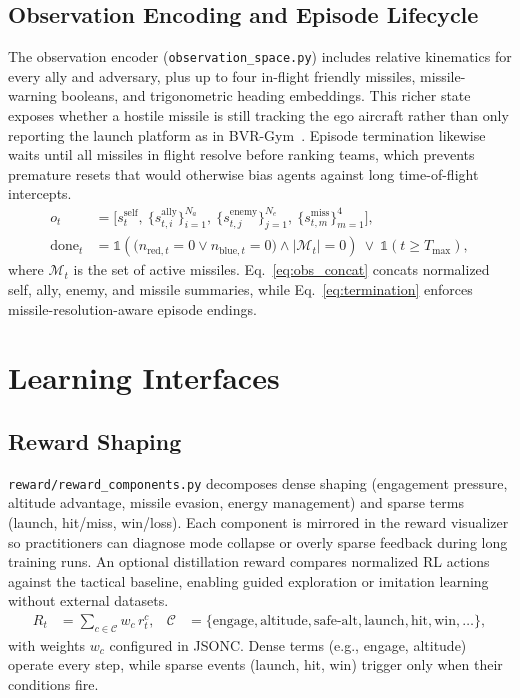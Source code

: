 \documentclass[11pt]{article}
\begin{document}
\subsection{Observation Encoding and Episode Lifecycle}
The observation encoder (\texttt{observation\_space.py}) includes relative kinematics for every ally and adversary, plus up to four in-flight friendly missiles, missile-warning booleans, and trigonometric heading embeddings. This richer state exposes whether a hostile missile is still tracking the ego aircraft rather than only reporting the launch platform as in BVR-Gym~\cite{scukins2024bvrgym}. Episode termination likewise waits until all missiles in flight resolve before ranking teams, which prevents premature resets that would otherwise bias agents against long time-of-flight intercepts.
\begin{align}
o_t &= \Big[s^{\text{self}}_t,\ \{s^{\text{ally}}_{t,i}\}_{i=1}^{N_a},\ \{s^{\text{enemy}}_{t,j}\}_{j=1}^{N_e},\ \{s^{\text{miss}}_{t,m}\}_{m=1}^{4}\Big], \label{eq:obs_concat}\\
\text{done}_t &= \mathbb{1}\!\left(\big(n_{\text{red},t}=0 \lor n_{\text{blue},t}=0\big) \land |\mathcal{M}_t|=0\right)\ \lor\ \mathbb{1}(t \ge T_{\max}), \label{eq:termination}
\end{align}
where $\mathcal{M}_t$ is the set of active missiles. Eq.~\eqref{eq:obs_concat} concats normalized self, ally, enemy, and missile summaries, while Eq.~\eqref{eq:termination} enforces missile-resolution-aware episode endings.

\section{Learning Interfaces}
\subsection{Reward Shaping}
\texttt{reward/reward\_components.py} decomposes dense shaping (engagement pressure, altitude advantage, missile evasion, energy management) and sparse terms (launch, hit/miss, win/loss). Each component is mirrored in the reward visualizer so practitioners can diagnose mode collapse or overly sparse feedback during long training runs. An optional distillation reward compares normalized RL actions against the tactical baseline, enabling guided exploration or imitation learning without external datasets.
\begin{align}
R_t &= \sum_{c \in \mathcal{C}} w_c\,r^c_t,&
\mathcal{C} &= \{\text{engage}, \text{altitude}, \text{safe-alt}, \text{launch}, \text{hit}, \text{win}, \ldots\}, \label{eq:reward_sum}
\end{align}
with weights $w_c$ configured in JSONC. Dense terms (e.g., engage, altitude) operate every step, while sparse events (launch, hit, win) trigger only when their conditions fire.
\end{document}
